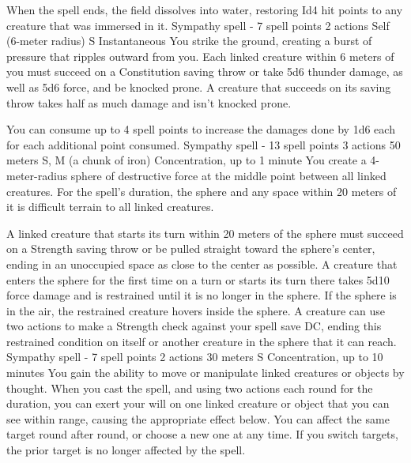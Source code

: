     When the spell ends, the field dissolves into water, restoring Id4 hit points to any creature that was immersed in it.
    {Sympathy spell - 7 spell points}
    {2 actions}
    {Self (6-meter radius)}
    {S}
    {Instantaneous}
    You strike the ground, creating a burst of pressure that ripples outward from you.
    Each linked creature within 6 meters of you must succeed on a Constitution saving throw or take 5d6 thunder damage, as well as 5d6 force, and be knocked prone.
    A creature that succeeds on its saving throw takes half as much damage and isn't knocked prone.

    You can consume up to 4 spell points to increase the damages done by 1d6 each for each additional point consumed.
    {Sympathy spell - 13 spell points}
    {3 actions}
    {50 meters}
    {S, M (a chunk of iron)}
    {Concentration, up to 1 minute}
    You create a 4-meter-radius sphere of destructive force at the middle point between all linked creatures.
    For the spell's duration, the sphere and any space within 20 meters of it is difficult terrain to all linked creatures.

    A linked creature that starts its turn within 20 meters of the sphere must succeed on a Strength saving throw or be pulled straight toward the sphere's center, ending in an unoccupied space as close to the center as possible.
    A creature that enters the sphere for the first time on a turn or starts its turn there takes 5d10 force damage and is restrained until it is no longer in the sphere.
    If the sphere is in the air, the restrained creature hovers inside the sphere.
    A creature can use two actions to make a Strength check against your spell save DC, ending this restrained condition on itself or another creature in the sphere that it can reach.
    {Sympathy spell - 7 spell points}
    {2 actions}
    {30 meters}
    {S}
    {Concentration, up to 10 minutes}
    You gain the ability to move or manipulate linked creatures or objects by thought.
    When you cast the spell, and using two actions each round for the duration, you can exert your will on one linked creature or object that you can see within range, causing the appropriate effect below.
    You can affect the same target round after round, or choose a new one at any time.
    If you switch targets, the prior target is no longer affected by the spell.

